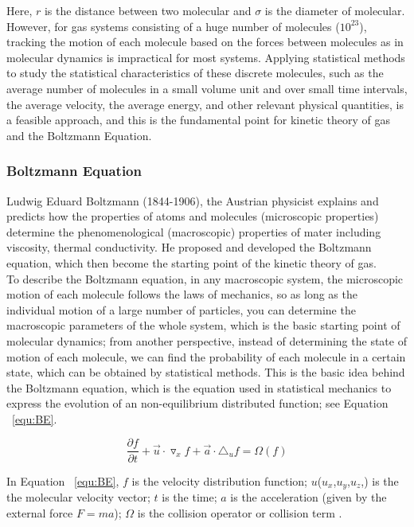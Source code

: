 Here, $r$ is the distance between two molecular and $\sigma$ is the diameter of molecular.\\

However, for gas systems consisting of a huge number of molecules ($10^{23}$), tracking the motion of each molecule based on the forces between molecules as in molecular dynamics is impractical for most systems. Applying statistical methods to study the statistical characteristics of these discrete molecules, such as the average number of molecules in a small volume unit and over small time intervals, the average velocity, the average energy, and other relevant physical quantities, is a feasible approach, and this is the fundamental point for kinetic theory of gas and the Boltzmann Equation.

\subsubsection{Boltzmann Equation}
Ludwig Eduard Boltzmann (1844-1906), the Austrian physicist explains and predicts how the properties of atoms and molecules (microscopic properties) determine the phenomenological (macroscopic) properties of mater including viscosity, thermal conductivity\cite{lbmmbook}. He proposed and developed the Boltzmann equation, which then become the starting point of the kinetic theory of gas.\\

To describe the Boltzmann equation, in any macroscopic system, the microscopic motion of each molecule follows the laws of mechanics, so as long as the individual motion of a large number of particles, you can determine the macroscopic parameters of the whole system, which is the basic starting point of molecular dynamics; from another perspective, instead of determining the state of motion of each molecule, we can find the probability of each molecule in a certain state, which can be obtained by statistical methods. This is the basic idea behind the Boltzmann equation, which is the equation used in statistical mechanics to express the evolution of an non-equilibrium distributed function; see Equation ~\ref{equ:BE}.

\begin{equation}
\label{equ:BE}
    \frac {\partial f}{\partial t} + \vec u \cdot \triangledown _x f + \vec a \cdot \triangle _ u f = \Omega (f)
\end{equation}

In Equation ~\ref{equ:BE}, $f$ is the velocity distribution function; $u$($u_x$,$u_y$,$u_z$,) is the the molecular velocity vector; $t$ is the time; $a$ is the acceleration (given by the external force $F=ma$); $\Omega$ is the collision operator or collision term \cite{succi2001lattice}.

